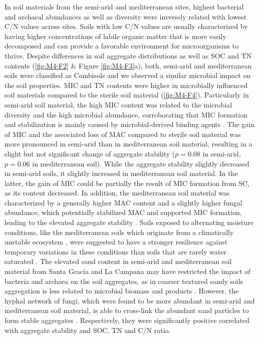 In soil materials from the semi-arid and mediterranean sites, highest bacterial and archaeal abundances as well as diversity were inversely related with lowest C/N values across sites. Soils with low C/N values are usually characterized by having higher concentrations of labile organic matter that is more easily decomposed \citep{Kuramae2012} and can provide a favorable environment for microorganisms to thrive. Despite differences in soil aggregate distributions as well as SOC and TN contents (\ref{fig:M4-F2} \& Figure \ref{fig:M4-F3}a), both, semi-arid and mediterranean soils were classified as Cambisols \citep{Bernhard2018} and we observed a similar microbial impact on the soil properties. MIC and TN contents were higher in microbially influenced soil materials compared to the sterile soil material (\ref{fig:M4-F4}). Particularly in semi-arid soil material, the high MIC content was related to the microbial diversity and the high microbial abundance, corroborating that MIC formation and stabilization is mainly caused by microbial-derived binding agents \citep{Six2004}. 
The gain of MIC and the associated loss of MAC compared to sterile soil material was more pronounced in semi-arid than in mediterranean soil material, resulting in a slight but not significant change of aggregate stability (\(p = 0.08\) in semi-arid, \(p = 0.06\) in mediterranean soil). While the aggregate stability slightly decreased in semi-arid soils, it slightly increased in mediterranean soil material. In the latter, the gain of MIC could be partially the result of MIC formation from SC, as its content decreased. In addition, the mediterranean soil material was characterized by a generally higher MAC content and a slightly higher fungal abundance, which potentially stabilized MAC and supported MIC formation, leading to the elevated aggregate stability \citep{Chotte2005}. Soils exposed to alternating moisture conditions, like the mediterranean soils which originate from a climatically unstable ecosystem \citep{Rodriguez2022}, were suggested to have a stronger resilience against temporary variations in these conditions than soils that are rarely water saturated \citep{Totsche2018}. The elevated sand content in semi-arid and mediterranean soil material from Santa Gracia and La Campana \citep{Bernhard2018} may have restricted the impact of bacteria and archaea on the soil aggregates, as in coarser textured sandy soils aggregation is less related to microbial biomass and products \citep{Degens1996}. However, the hyphal network of fungi, which were found to be more abundant in semi-arid and mediterranean soil material, is able to cross-link the abundant sand particles to form stable aggregates \citep{Six2004}. Respectively, they were significantly positive correlated with aggregate stability and SOC, TN and C/N ratio.

